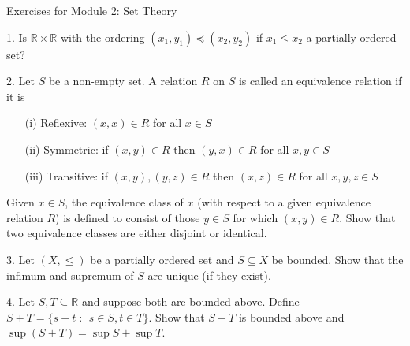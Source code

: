 \documentclass{article}
\theoremstyle{remark} %
\newcommand{\R}{{\mathbb{R}}}
\begin{document}
\begin{center}
\Large{Exercises for Module 2: Set Theory}
\end{center}

1. Is $\R \times \R$ with the ordering $(x_1,y_1) \preceq (x_2,y_2)$ if $x_1 \leq x_2$ a partially ordered set? 

\vspace{6cm} %



2. Let $S$ be a non-empty set. A relation $R$ on $S$ is called an equivalence relation if it is
    \begin{enumerate}
        \item[(i)] Reflexive: $(x,x) \in R$ for all $x \in S$
        \item[(ii)] Symmetric: if $(x,y) \in R$  then $(y,x) \in R$ for all $x,y \in S$
        \item[(iii)] Transitive: if $(x,y), (y,z) \in R$ then $(x,z) \in R$ for all $x,y,z \in S$
    \end{enumerate}
Given $x \in S$, the equivalence class of $x$ (with respect to a given equivalence relation $R$) is defined to consist of those $y \in S$ for which $(x,y) \in R$. Show that two equivalence classes are either disjoint or identical.

\vspace{13cm} %


3. Let $(X, \leq)$ be a partially ordered set and $S\subseteq X$ be bounded. Show that the infimum and supremum of $S$ are unique (if they exist).

\vspace{11cm} %


4. Let $S,T \subseteq \R$ and suppose both are bounded above. Define $S+T = \{s + t \; \colon \;  \, s\in S,t\in T\}$. Show that $S+T$ is bounded above and $\sup(S+T) = \sup S + \sup T$. 

\vspace{11cm} %

\end{document}
